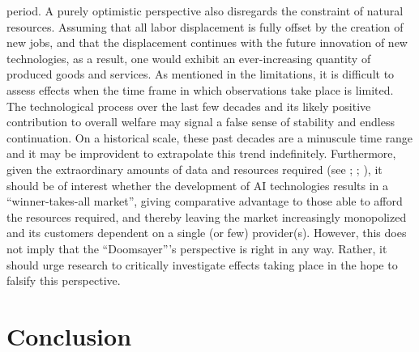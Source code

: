 \documentclass[
  12pt,
  a4paperpaper,
]{article}
\begin{document}
period. A purely optimistic perspective also disregards the constraint
of natural resources. Assuming that all labor displacement is fully
offset by the creation of new jobs, and that the displacement continues
with the future innovation of new technologies, as a result, one would
exhibit an ever-increasing quantity of produced goods and services. As
mentioned in the limitations, it is difficult to assess effects when the
time frame in which observations take place is limited. The
technological process over the last few decades and its likely positive
contribution to overall welfare may signal a false sense of stability
and endless continuation. On a historical scale, these past decades are
a minuscule time range and it may be improvident to extrapolate this
trend indefinitely. Furthermore, given the extraordinary amounts of data
and resources required (see ; ; ), it should be of interest whether the development of AI
technologies results in a ``winner-takes-all market'', giving
comparative advantage to those able to afford the resources required,
and thereby leaving the market increasingly monopolized and its
customers dependent on a single (or few) provider(s). However, this does
not imply that the ``Doomsayer'''s perspective is right in any way.
Rather, it should urge research to critically investigate effects taking
place in the hope to falsify this perspective.

\section{Conclusion}\label{sec-conclusion}
\end{document}
